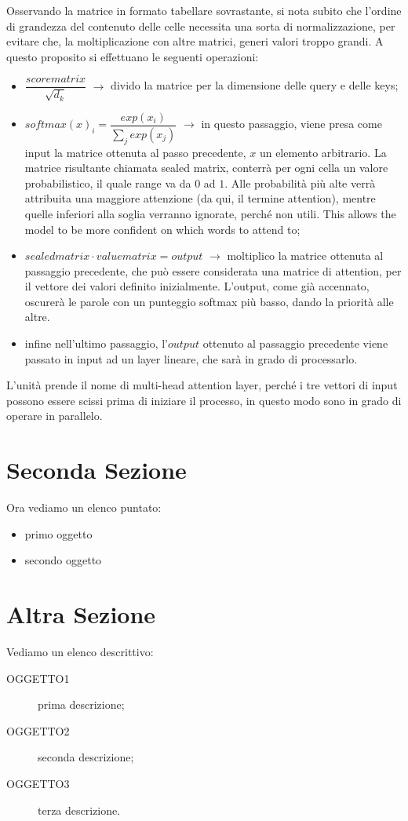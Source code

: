 Osservando la matrice in formato tabellare sovrastante, si nota subito che l'ordine di grandezza del contenuto delle celle necessita una sorta di normalizzazione, per evitare che, la moltiplicazione con altre matrici, generi valori troppo grandi. A questo proposito si effettuano le seguenti operazioni:
\begin{itemize}
	\item $\dfrac{score matrix}{\sqrt{d_{k}}}$ $\rightarrow$ divido la matrice per la dimensione delle query e delle keys;
	\item $softmax(x)_{i} = \dfrac{exp(x_i)}{\sum_{j} exp(x_j)}$ $\rightarrow$ in questo passaggio, viene presa come input la matrice ottenuta al passo precedente, $x$ un elemento arbitrario. La matrice risultante chiamata sealed matrix, conterrà per ogni cella un valore probabilistico, il quale range va da $0$ ad $1$. Alle probabilità più alte verrà attribuita una maggiore attenzione (da qui, il termine attention), mentre quelle inferiori alla soglia verranno ignorate, perché non utili. This allows the model to be more confident on which words to attend to;
	\item $sealed matrix \cdot value matrix = output$ $\rightarrow$ moltiplico la matrice ottenuta al passaggio precedente, che può essere considerata una matrice di attention, per il vettore dei valori definito inizialmente. L'output, come già accennato, oscurerà le parole con un punteggio softmax più basso, dando la priorità alle altre.
	\item infine nell'ultimo passaggio, l'$output$ ottenuto al passaggio precedente viene passato in input ad un layer lineare, che sarà in grado di processarlo.
\end{itemize}
L'unità prende il nome di multi-head attention layer, perché i tre vettori di input possono essere scissi prima di iniziare il processo, in questo modo sono in grado di operare in parallelo.

\section{Seconda Sezione}
Ora vediamo un elenco puntato:
\begin{itemize}                         %
\item primo oggetto
\item secondo oggetto
\end{itemize}

\section{Altra Sezione}
Vediamo un elenco descrittivo:
\begin{description}                     %
  \item[OGGETTO1] prima descrizione;
  \item[OGGETTO2] seconda descrizione;
  \item[OGGETTO3] terza descrizione.
\end{description}

